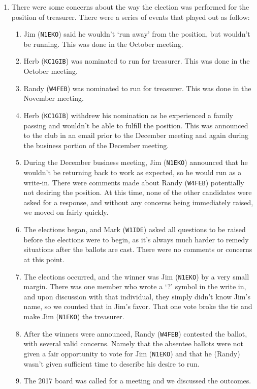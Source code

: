 \documentclass[10pt,letterpaper]{article}
\begin{document}
\begin{enumerate}
  \item There were some concerns about the way the election was performed for the position of treasurer. There were a series of events that played out as follow:
  \begin{enumerate}
    \item Jim (\texttt{N1EKO}) said he wouldn't `run away' from the position, but wouldn't be running. This was done in the October meeting.
    \item Herb (\texttt{KC1GIB}) was nominated to run for treasurer. This was done in the October meeting.
    \item Randy (\texttt{W4FEB}) was nominated to run for treasurer. This was done in the November meeting.
    \item Herb (\texttt{KC1GIB}) withdrew his nomination as he experienced a family passing and wouldn't be able to fulfill the position. This was announced to the club in an email prior to the December meeting and again during the business portion of the December meeting.
    \item During the December business meeting, Jim (\texttt{N1EKO}) announced that he wouldn't be returning back to work as expected, so he would run as a write-in. There were comments made about Randy (\texttt{W4FEB}) potentially not desiring the position. At this time, none of the other candidates were asked for a response, and without any concerns being immediately raised, we moved on fairly quickly.
    \item The elections began, and Mark (\texttt{W1IDE}) asked all questions to be raised before the elections were to begin, as it's always much harder to remedy situations after the ballots are cast. There were no comments or concerns at this point.
    \item The elections occurred, and the winner was Jim (\texttt{N1EKO}) by a very small margin. There was one member who wrote a `?' symbol in the write in, and upon discussion with that individual, they simply didn't know Jim's name, so we counted that in Jim's favor. That one vote broke the tie and make Jim (\texttt{N1EKO}) the treasurer.
    \item After the winners were announced, Randy (\texttt{W4FEB}) contested the ballot, with several valid concerns. Namely that the absentee ballots were not given a fair opportunity to vote for Jim (\texttt{N1EKO}) and that he (Randy) wasn't given sufficient time to describe his desire to run.
    \item The 2017 board was called for a meeting and we discussed the outcomes.

\end{enumerate}
\end{enumerate}
\end{document}
